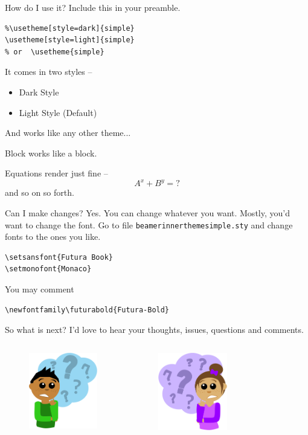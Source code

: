 \documentclass[xetex, aspectratio=169]{beamer}
\begin{document}
\begin{frame}[fragile]{How do I use it?}
	Include this in your preamble.
\begin{verbatim}
%\usetheme[style=dark]{simple}
\usetheme[style=light]{simple} 
% or  \usetheme{simple}
\end{verbatim}

It comes in	two styles --
\begin{itemize}
	\item Dark Style
	\item \alert{Light Style (Default)}
\end{itemize}

And works like any other theme...

\begin{block}{Block}
works like a block.
\end{block}

Equations render just fine -- 
\begin{equation}
A^x + B^y = ?
\end{equation}
and so on so forth.
\end{frame}

\begin{frame}[fragile]{Can I make changes?}
Yes. You can change whatever you want. Mostly, you'd want to change the font. Go to file \verb|beamerinnerthemesimple.sty| and change fonts to the ones you like.
\begin{verbatim}
\setsansfont{Futura Book}
\setmonofont{Monaco}
\end{verbatim}
You may comment 
\begin{verbatim}
\newfontfamily\futurabold{Futura-Bold}
\end{verbatim}
\end{frame}

\begin{frame}[fragile]{So what is next?}
\centering 
\alert{I'd love to hear your thoughts, issues, questions and comments.}
\begin{columns}
	\begin{figure}
		\includegraphics[width=3cm]{img/questionguy}
	\end{figure}
		\begin{figure}
		\includegraphics[width=3cm]{img/questiongirl}
	\end{figure}
\end{columns}
\end{frame}
\end{document}
